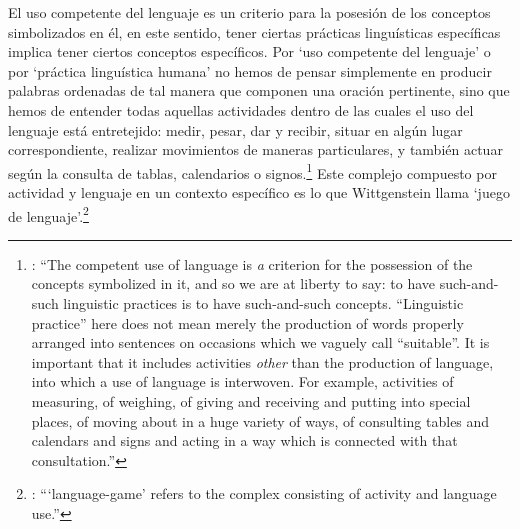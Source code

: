 El uso competente del lenguaje es un criterio para la posesión de los conceptos simbolizados en él, en este sentido, tener ciertas prácticas linguísticas específicas implica tener ciertos conceptos específicos. Por `uso competente del lenguaje' o por `práctica linguística humana' no hemos de pensar simplemente en producir palabras ordenadas de tal manera que componen una oración pertinente, sino que hemos de entender todas aquellas actividades dentro de las cuales el uso del lenguaje está entretejido: medir, pesar, dar y recibir, situar en algún lugar correspondiente, realizar movimientos de maneras particulares, y también actuar según la consulta de tablas, calendarios o signos.\footnote{\cite[Cf.~][117]{anscombe1981parmenides:qli}: \enquote{The competent use of language is \emph{a} criterion for the possession of the concepts symbolized in it, and so we are at liberty to say: to have such-and-such linguistic practices is to have such-and-such concepts. ``Linguistic practice'' here does not mean merely the production of words properly arranged into sentences on occasions which we vaguely call ``suitable''. It is important that it includes activities \emph{other} than the production of language, into which a use of language is interwoven. For example, activities of measuring, of weighing, of giving and receiving and putting into special places, of moving about in a huge variety of ways, of consulting tables and calendars and signs and acting in a way which is connected with that consultation.}} Este complejo compuesto por actividad y lenguaje en un contexto específico es lo que Wittgenstein llama `juego de lenguaje'.\footnote{\cite[Cf.~][62]{bakerhacker2009understanding}: \enquote{`language-game' refers to the complex consisting of activity and language use.}}

